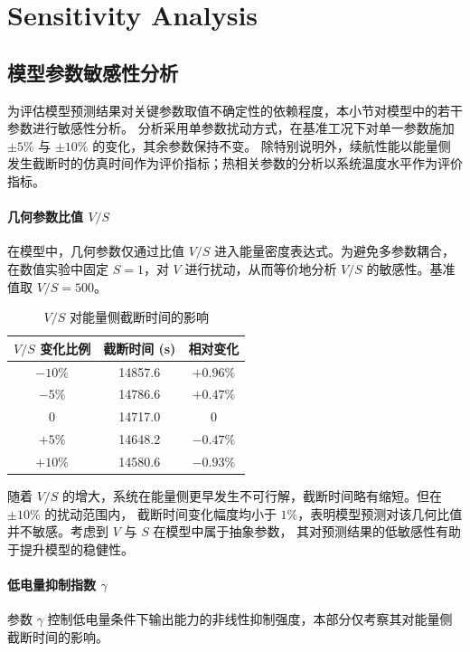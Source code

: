 \documentclass[11pt]{article}
\begin{document}
\section{Sensitivity Analysis}

\subsection{模型参数敏感性分析}

为评估模型预测结果对关键参数取值不确定性的依赖程度，本小节对模型中的若干参数进行敏感性分析。
分析采用单参数扰动方式，在基准工况下对单一参数施加 $\pm5\%$ 与 $\pm10\%$ 的变化，其余参数保持不变。
除特别说明外，续航性能以能量侧发生截断时的仿真时间作为评价指标；热相关参数的分析以系统温度水平作为评价指标。

\paragraph{几何参数比值 $V/S$}

在模型中，几何参数仅通过比值 $V/S$ 进入能量密度表达式。为避免多参数耦合，在数值实验中固定 $S=1$，对 $V$ 进行扰动，从而等价地分析 $V/S$ 的敏感性。基准值取 $V/S=500$。

\begin{table}[H]
\centering
\caption{$V/S$ 对能量侧截断时间的影响}
\begin{tabular}{ccc}
\hline
$V/S$ 变化比例 & 截断时间 (s) & 相对变化 \\ \hline
$-10\%$ & 14857.6 & $+0.96\%$ \\
$-5\%$  & 14786.6 & $+0.47\%$ \\
$0$     & 14717.0 & $0$ \\
$+5\%$  & 14648.2 & $-0.47\%$ \\
$+10\%$ & 14580.6 & $-0.93\%$ \\ \hline
\end{tabular}
\end{table}

随着 $V/S$ 的增大，系统在能量侧更早发生不可行解，截断时间略有缩短。但在 $\pm10\%$ 的扰动范围内，
截断时间变化幅度均小于 $1\%$，表明模型预测对该几何比值并不敏感。考虑到 $V$ 与 $S$ 在模型中属于抽象参数，
其对预测结果的低敏感性有助于提升模型的稳健性。

\paragraph{低电量抑制指数 $\gamma$}

参数 $\gamma$ 控制低电量条件下输出能力的非线性抑制强度，本部分仅考察其对能量侧截断时间的影响。
\end{document}
